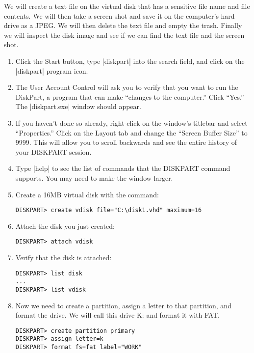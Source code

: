 We will create a text file on the virtual disk that has a sensitive file
name and file contents. We will then take a screen shot and save it on
the computer's hard drive as a JPEG. We will then delete the text file
and empty the trash. Finally we will inspect the disk image and see if
we can find the text file and the screen shot.


\begin{enumerate}


\item Click the Start button, type |diskpart| into the search field,
and click on the |diskpart| program icon.
\item The User Account Control will ask you to verify that you want to
run the DiskPart, a program that can make ``changes to the computer.''
Click ``Yes.''  The |diskpart.exe| window should appear.
\item If you haven't done so already, right-click on the window's
titlebar and select ``Properties.'' Click on the Layout tab and change
the ``Screen Buffer Size'' to 9999. This will allow you to scroll
backwards and see the entire history of your DISKPART session.
\item Type |help| to see the list of commands that the DISKPART
command supports. You may need to make the window larger.

\item Create a 16MB virtual disk with the command:

\begin{Verbatim}
DISKPART> create vdisk file="C:\disk1.vhd" maximum=16
\end{Verbatim}

\item Attach the disk you just created:
\begin{Verbatim}
DISKPART> attach vdisk
\end{Verbatim}

\item Verify that the disk is attached:
\begin{Verbatim}
DISKPART> list disk
...
DISKPART> list vdisk
\end{Verbatim}

\item Now we need to create a partition, assign a letter to that
partition, and format the drive. We will call this drive K: and format
it with FAT. 
\begin{Verbatim}
DISKPART> create partition primary
DISKPART> assign letter=k
DISKPART> format fs=fat label="WORK"
\end{Verbatim}


\end{enumerate}
